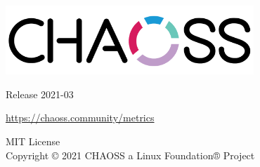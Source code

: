 \begin{titlepage}
    \begin{center}
        \vspace*{1.5cm}
            
        \includegraphics[width=0.7\textwidth]{Chaoss_logo.png}
        
	\vspace{2cm}


        \vspace{1cm}
        \Huge
        Release 2021-03
            
        \vspace{1.5cm}
        
	\LARGE
	    \url{https://chaoss.community/metrics}
            
        \vfill
            
        \Large
        MIT License\\
        Copyright © 2021 CHAOSS a Linux Foundation® Project\\
            
    \end{center}
\end{titlepage}

\thispagestyle{empty}

